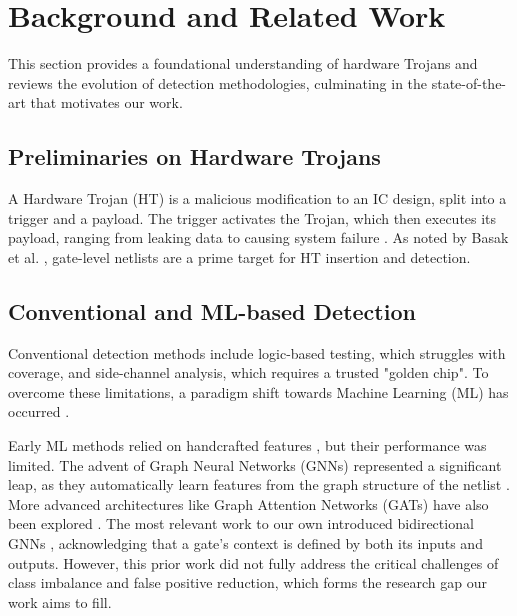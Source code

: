 \documentclass[conference]{IEEEtran}
\begin{document}
\FloatBarrier
\section{Background and Related Work}
\label{sec:background}
This section provides a foundational understanding of hardware Trojans and reviews the evolution of detection methodologies, culminating in the state-of-the-art that motivates our work.

\subsection{Preliminaries on Hardware Trojans}
A Hardware Trojan (HT) is a malicious modification to an IC design, split into a trigger and a payload. The trigger activates the Trojan, which then executes its payload, ranging from leaking data to causing system failure \cite{Karri2010Intro}. As noted by Basak et al. \cite{Basak2017Classification}, gate-level netlists are a prime target for HT insertion and detection.

\subsection{Conventional and ML-based Detection}
Conventional detection methods include logic-based testing, which struggles with coverage, and side-channel analysis, which requires a trusted "golden chip". To overcome these limitations, a paradigm shift towards Machine Learning (ML) has occurred \cite{Koehler2023Tutorial}.

Early ML methods relied on handcrafted features \cite{Hao2020StructuralFeatures}, but their performance was limited. The advent of Graph Neural Networks (GNNs) represented a significant leap, as they automatically learn features from the graph structure of the netlist \cite{Wecel2022GNN}. More advanced architectures like Graph Attention Networks (GATs) have also been explored \cite{Li2024GATrojan}. The most relevant work to our own introduced bidirectional GNNs \cite{Al-Tawy2023BiGCN}, acknowledging that a gate's context is defined by both its inputs and outputs. However, this prior work did not fully address the critical challenges of class imbalance and false positive reduction, which forms the research gap our work aims to fill.

\FloatBarrier
\end{document}
